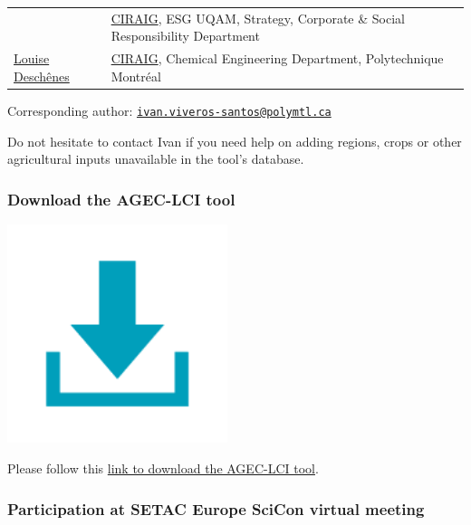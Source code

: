 \documentclass[openany]{book}
\begin{document}
\begin{longtable}[]{@{}ll@{}}
\begin{minipage}[t]{0.43\columnwidth}
\end{minipage} & \begin{minipage}[t]{0.51\columnwidth}\raggedright
\href{http://ciraig.org}{CIRAIG}, ESG UQAM, Strategy, Corporate \& Social Responsibility Department\strut
\end{minipage}\tabularnewline
\begin{minipage}[t]{0.43\columnwidth}\raggedright
\href{https://www.polymtl.ca/expertises/deschenes-louise}{Louise Deschênes}\strut
\end{minipage} & \begin{minipage}[t]{0.51\columnwidth}\raggedright
\href{http://ciraig.org}{CIRAIG}, Chemical Engineering Department, Polytechnique Montréal\strut
\end{minipage}\tabularnewline
\bottomrule
\end{longtable}

Corresponding author: \href{mailto:ivan.viveros-santos@polymtl.ca}{\nolinkurl{ivan.viveros-santos@polymtl.ca}}

Do not hesitate to contact Ivan if you need help on adding regions, crops or other agricultural inputs unavailable in the tool's database.

\hypertarget{download-the-agec-lci-tool}{%
\subsubsection*{Download the AGEC-LCI tool}\label{download-the-agec-lci-tool}}

\includegraphics[width=2.53in]{Figures/download_icon}

Please follow this \href{https://drive.google.com/uc?id=1W6N6YtFOAcYjaoyWdH7yVH0TG9iWFRZL\&export=download}{link to download the AGEC-LCI tool}.

\hypertarget{participation-at-setac-europe-scicon-virtual-meeting}{%
\subsubsection*{Participation at SETAC Europe SciCon virtual meeting}\label{participation-at-setac-europe-scicon-virtual-meeting}}
\end{document}
